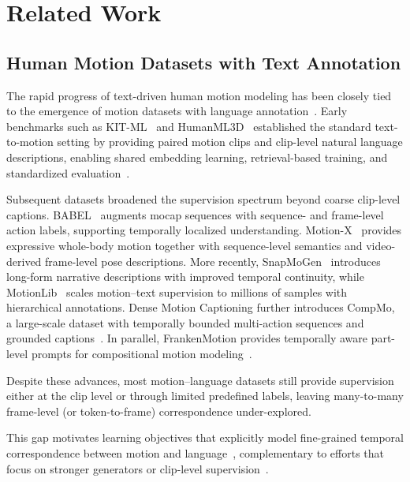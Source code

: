 
\section{Related Work}
\subsection{Human Motion Datasets with Text Annotation}

The rapid progress of text-driven human motion modeling has been closely tied to the emergence of motion datasets with language annotation~\cite{bensabath2024cross,wu2025mg,wang2024scaling,guo2025snapmogen}. Early benchmarks such as KIT-ML~\cite{Plappert2016} and HumanML3D~\cite{guo2022generating} established the standard text-to-motion setting by providing paired motion clips and clip-level natural language descriptions, enabling shared embedding learning, retrieval-based training, and standardized evaluation~\cite{petrovich2023tmr}. 

Subsequent datasets broadened the supervision spectrum beyond coarse clip-level captions. BABEL~\cite{punnakkal2021babel} augments mocap sequences with sequence- and frame-level action labels, supporting temporally localized understanding. Motion-X~\cite{lin2023motion} provides expressive whole-body motion together with sequence-level semantics and video-derived frame-level pose descriptions. More recently, SnapMoGen~\cite{guo2025snapmogen} introduces long-form narrative descriptions with improved temporal continuity, while MotionLib~\cite{wang2024scaling} scales motion--text supervision to millions of samples with hierarchical annotations. Dense Motion Captioning further introduces CompMo, a large-scale dataset with temporally bounded multi-action sequences and grounded captions~\cite{xudense}. In parallel, FrankenMotion provides temporally aware part-level prompts for compositional motion modeling~\cite{li2026frankenmotion}.

Despite these advances, most motion--language datasets still provide supervision either at the clip level or through limited predefined labels, leaving many-to-many frame-level (or token-to-frame) correspondence under-explored. 

This gap motivates learning objectives that explicitly model fine-grained temporal correspondence between motion and language~\cite{xudense,li2025unimotion}, complementary to efforts that focus on stronger generators or clip-level supervision~\cite{tevet2022human,zhang2023generating,guo2024momask,meng2025rethinking}.

